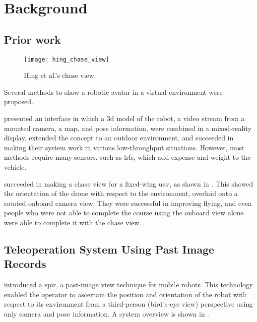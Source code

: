 \chapter{Background}
\label{ch:background}

\section{Prior work}

  \begin{wrapfigure}{r}{0.5\textwidth}
    \centering
    \texttt{[image: hing\_chase\_view]}
    \caption[Hing et al. chase view]{Hing et al.'s chase view.\cite{hing2009}}
    \label{fig:hing_chase_view}
  \end{wrapfigure}

  Several methods to show a robotic avatar in a virtual environment were proposed.

  \textcite{nielsen2007} presented an interface in which a \gls{3d} model of the robot, a video stream from a mounted camera, a map, and pose information, were combined in a mixed-reality display.
  \textcite{kelly2011} extended the concept to an outdoor environment, and succeeded in making their system work in various low-throughput situations.
  However, most methods require many sensors, such as \glspl{lrf}, which add expense and weight to the vehicle.

  \textcite{hing2009} succeeded in making a chase view for a fixed-wing \gls{uav}, as shown in .
  This showed the orientation of the drone with respect to the environment, overlaid onto a rotated onboard camera view.
  They were successful in improving flying, and even people who were not able to complete the course using the onboard view alone were able to complete it with the chase view.

\section{Teleoperation System Using Past Image Records}
  \textcite{shiroma2004} introduced a \gls{spir}, a past-image view technique for mobile robots.
  This technology enabled the operator to ascertain the position and orientation of the robot with respect to its environment from a third-person (bird's-eye view) perspective using only camera and pose information.
  A system overview is shown in .

